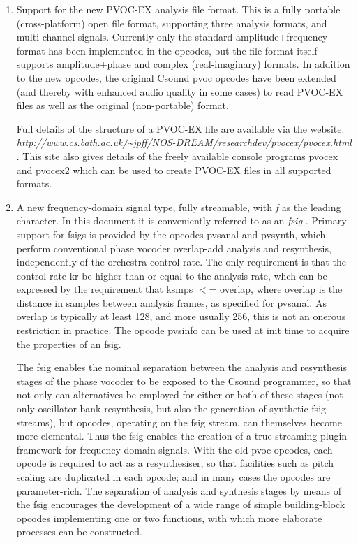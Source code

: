  
\begin{enumerate}
\item 

 Support for the new PVOC-EX analysis file format. This is a fully portable (cross-platform) open file format, supporting three analysis formats, and multi-channel signals. Currently only the standard amplitude+frequency format has been implemented in the opcodes, but the file format itself supports amplitude+phase and complex (real-imaginary) formats. In addition to the new opcodes, the original Csound pvoc opcodes have been extended (and thereby with enhanced audio quality in some cases) to read PVOC-EX files as well as the original (non-portable) format.


 Full details of the structure of a PVOC-EX file are available via the website: \emph{\url{http://www.cs.bath.ac.uk/~jpff/NOS-DREAM/researchdev/pvocex/pvocex.html}}
. This site also gives details of the freely available console programs pvocex and pvocex2 which can be used to create PVOC-EX files in all supported formats.

\item 

 A new frequency-domain signal type, fully streamable, with \emph{f}
 as the leading character. In this document it is conveniently referred to as an \emph{fsig}
. Primary support for fsigs is provided by the opcodes pvsanal and pvsynth, which perform conventional phase vocoder overlap-add analysis and resynthesis, independently of the orchestra control-rate. The only requirement is that the control-rate kr be higher than or equal to the analysis rate, whch can be expressed by the requirement that ksmps $<$= overlap, where overlap is the distance in samples between analysis frames, as specified for pvsanal. As overlap is typically at least 128, and more usually 256, this is not an onerous restriction in practice. The opcode pvsinfo can be used at init time to acquire the properties of an fsig.


 The fsig enables the nominal separation between the analysis and resynthesis stages of the phase vocoder to be exposed to the Csound programmer, so that not only can alternatives be employed for either or both of these stages (not only oscillator-bank resynthesis, but also the generation of synthetic fsig streams), but opcodes, operating on the fsig stream, can themselves become more elemental. Thus the fsig enables the creation of a true streaming plugin framework for frequency domain signals. With the old pvoc opcodes, each opcode is required to act as a resynthesiser, so that facilities such as pitch scaling are duplicated in each opcode; and in many cases the opcodes are parameter-rich. The separation of analysis and synthesis stages by means of the fsig encourages the development of a wide range of simple building-block opcodes implementing one or two functions, with which more elaborate processes can be constructed.


\end{enumerate}


